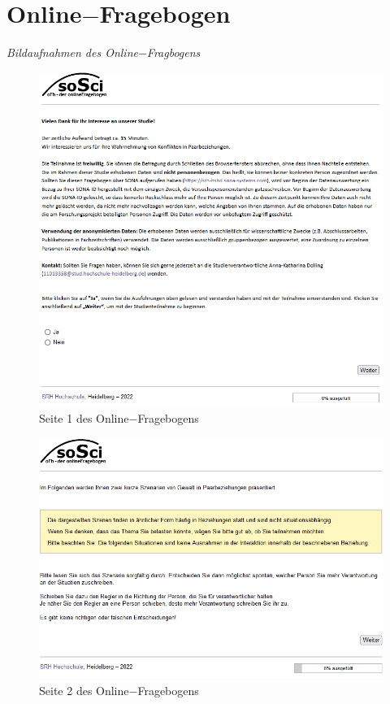 \begin{appendices}
\begin{figure}[htb!]
    \end{figure}
    
    


    \chapter{Online$-$Fragebogen}  \label{Fragebogen}
    \noindent \textit{Bildaufnahmen des Online$-$Fragbogens}

    \begin{figure}[htb!]
        \centering
            \includegraphics[width=\textwidth]{Seite 1.png}
            \caption[]{Seite 1 des Online$-$Fragebogens}
    \end{figure}

    \newpage
    \begin{figure}[htb!]
        \centering
            \includegraphics[width=\textwidth]{Seite 2.png}
            \caption[]{Seite 2 des Online$-$Fragebogens}
    \end{figure}


\end{appendices}
